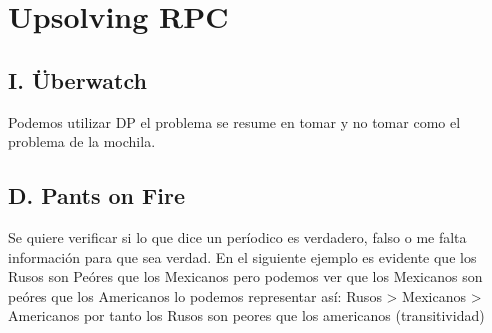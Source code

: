 \chapter{Upsolving RPC}

\section{I. Überwatch}
Podemos utilizar DP el problema se resume en tomar y no tomar como el problema de la mochila.

\section{D. Pants on Fire}
Se quiere verificar si lo que dice un períodico es verdadero, falso o me falta información para que sea verdad. 
En el siguiente ejemplo es evidente que los Rusos son Peóres que los Mexicanos pero podemos ver que los Mexicanos son peóres que los Americanos lo podemos representar así: \break 
Rusos > Mexicanos > Americanos por tanto los Rusos son peores que los americanos (transitividad)

